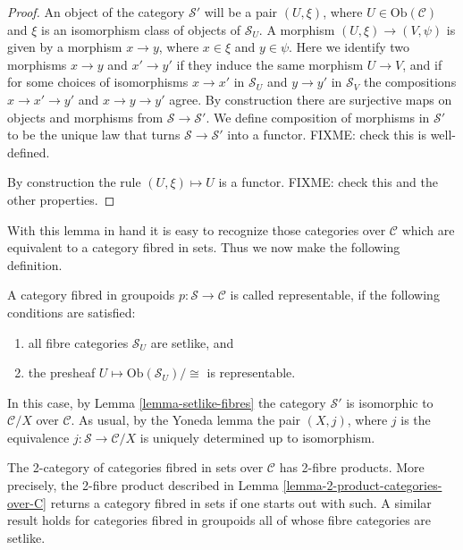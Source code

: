 \begin{proof}
An object of the category $\mathcal{S}'$ will be a pair $(U, \xi)$, where
$U \in \text{Ob}(\mathcal{C})$ and $\xi$ is an isomorphism class of objects
of $\mathcal{S}_U$. A morphism $(U,\xi) \to (V , \psi)$ is given by a 
morphism $x \to y$, where $x \in \xi$ and $y \in \psi$. Here we identify
two morphisms $x \to y$ and $x' \to y'$ if they induce the same morphism
$U \to V$, and if for some choices of isomorphisms $x \to x'$ in
$\mathcal{S}_U$ and $y \to y'$ in $\mathcal{S}_V$ the compositions
$x \to x' \to y'$ and $x \to y \to y'$ agree. By construction there are
surjective maps on objects and morphisms from $\mathcal{S} \to
\mathcal{S}'$. We define composition of morphisms in $\mathcal{S}'$ to
be the unique law that turns $\mathcal{S} \to \mathcal{S}'$ into a functor.
FIXME: check this is well-defined. 

\smallskip\noindent
By construction the rule $(U,\xi) \mapsto U$ is a functor. FIXME: check this
and the other properties.
\end{proof}

\noindent
With this lemma in hand it is easy to recognize those categories over
$\mathcal{C}$ which are equivalent to a category fibred in sets. Thus we
now make the following definition.

\begin{definition}
\label{definition-representable-fibred-category}
A category fibred in groupoids $p : \mathcal{S} \to \mathcal{C}$ is
called representable, if the following conditions are satisfied:
\begin{enumerate}
\item all fibre categories $\mathcal{S}_U$ are setlike, and
\item the presheaf $U \mapsto \text{Ob}(\mathcal{S}_U)/\cong$ is 
representable.
\end{enumerate}
\end{definition}

\noindent
In this case, by Lemma \ref{lemma-setlike-fibres} the category 
$\mathcal{S}'$ is isomorphic to $\mathcal{C}/X$ over $\mathcal{C}$.
As usual, by the Yoneda lemma the pair $(X,j)$, where $j$ is the
equivalence $j : \mathcal{S} \to \mathcal{C}/X$ is uniquely determined
up to isomorphism.

\begin{lemma}
\label{lemma-2-product-categories-fibred-sets}
The 2-category of categories fibred in sets over $\mathcal{C}$
has 2-fibre products. More precisely, the 2-fibre product described in 
Lemma \ref{lemma-2-product-categories-over-C} returns a category fibred in
sets if one starts out with such. A similar result holds for categories
fibred in groupoids all of whose fibre categories are setlike.
\end{lemma}

